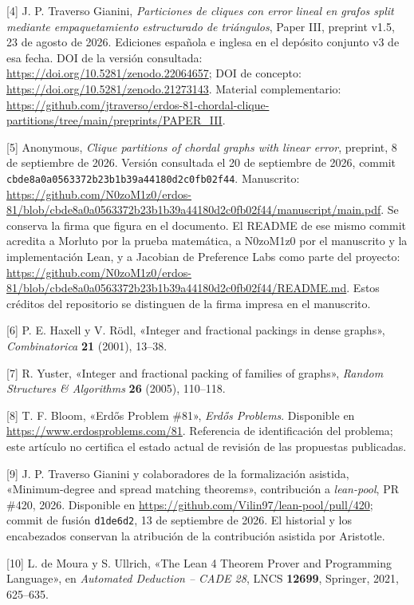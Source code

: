 \documentclass[spanish,11pt,a4paper]{article}
\begin{document}
{[}4{]} J. P. Traverso Gianini, \emph{Particiones de cliques con error
lineal en grafos split mediante empaquetamiento estructurado de
triángulos}, Paper III, preprint v1.5, 23 de agosto de 2026. Ediciones
española e inglesa en el depósito conjunto v3 de esa fecha. DOI de la
versión consultada: \url{https://doi.org/10.5281/zenodo.22064657}; DOI
de concepto: \url{https://doi.org/10.5281/zenodo.21273143}. Material
complementario:
\url{https://github.com/jtraverso/erdos-81-chordal-clique-partitions/tree/main/preprints/PAPER_III}.

{[}5{]} Anonymous, \emph{Clique partitions of chordal graphs with linear
error}, preprint, 8 de septiembre de 2026. Versión consultada el 20 de
septiembre de 2026, commit
\nolinkurl{cbde8a0a0563372b23b1b39a44180d2c0fb02f44}. Manuscrito:
\url{https://github.com/N0zoM1z0/erdos-81/blob/cbde8a0a0563372b23b1b39a44180d2c0fb02f44/manuscript/main.pdf}.
Se conserva la firma que figura en el documento. El README de ese mismo
commit acredita a Morluto por la prueba matemática, a N0zoM1z0 por el
manuscrito y la implementación Lean, y a Jacobian de Preference Labs
como parte del proyecto:
\url{https://github.com/N0zoM1z0/erdos-81/blob/cbde8a0a0563372b23b1b39a44180d2c0fb02f44/README.md}.
Estos créditos del repositorio se distinguen de la firma impresa en el
manuscrito.

{[}6{]} P. E. Haxell y V. Rödl, «Integer and fractional packings in
dense graphs», \emph{Combinatorica} \textbf{21} (2001), 13--38.

{[}7{]} R. Yuster, «Integer and fractional packing of families of
graphs», \emph{Random Structures \& Algorithms} \textbf{26} (2005),
110--118.

{[}8{]} T. F. Bloom, «Erdős Problem \#81», \emph{Erdős Problems}.
Disponible en \url{https://www.erdosproblems.com/81}. Referencia de
identificación del problema; este artículo no certifica el estado actual
de revisión de las propuestas publicadas.

{[}9{]} J. P. Traverso Gianini y colaboradores de la formalización
asistida, «Minimum-degree and spread matching theorems», contribución a
\emph{lean-pool}, PR \#420, 2026. Disponible en
\url{https://github.com/Vilin97/lean-pool/pull/420}; commit de fusión
\nolinkurl{d1de6d2}, 13 de septiembre de 2026. El historial y los
encabezados conservan la atribución de la contribución asistida por
Aristotle.

{[}10{]} L. de Moura y S. Ullrich, «The Lean 4 Theorem Prover and
Programming Language», en \emph{Automated Deduction -- CADE 28}, LNCS
\textbf{12699}, Springer, 2021, 625--635.
\end{document}
